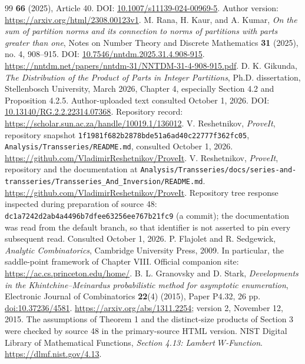 \documentclass[11pt]{article}
\numberwithin{equation}{section}
\theoremstyle{definition}\newtheorem{definition}[theorem]{Definition}
\theoremstyle{remark}\newtheorem{remark}[theorem]{Remark}
\begin{document}
{\begin{thebibliography}{99}
\textbf{66} (2025), Article 40. DOI:
\href{https://doi.org/10.1007/s11139-024-00969-5}{10.1007/s11139-024-00969-5}.
Author version: \url{https://arxiv.org/html/2308.00123v1}.
 M. Rana, H. Kaur, and A. Kumar,
\emph{On the sum of partition norms and its connection to norms of partitions
with parts greater than one}, Notes on Number Theory and Discrete Mathematics
\textbf{31} (2025), no. 4, 908--915. DOI:
\href{https://doi.org/10.7546/nntdm.2025.31.4.908-915}{10.7546/nntdm.2025.31.4.908-915}.
\url{https://nntdm.net/papers/nntdm-31/NNTDM-31-4-908-915.pdf}.
 D. K. Gikunda,
\emph{The Distribution of the Product of Parts in Integer Partitions},
Ph.D. dissertation, Stellenbosch University, March 2026, Chapter 4,
especially Section 4.2 and Proposition 4.2.5. Author-uploaded text consulted
October 1, 2026. DOI:
\href{https://doi.org/10.13140/RG.2.2.22314.07368}{10.13140/RG.2.2.22314.07368}.
Repository record: \url{https://scholar.sun.ac.za/handle/10019.1/136012}.
 V. Reshetnikov,
\emph{ProveIt}, repository snapshot
\texttt{1f1981f682b2878bde51a6ad40c22777f362fc05},
\texttt{Analysis/Transseries/README.md}, consulted October 1, 2026.
\url{https://github.com/VladimirReshetnikov/ProveIt}.
 V. Reshetnikov, \emph{ProveIt}, repository and the
documentation at
\nolinkurl{Analysis/Transseries/docs/series-and-transseries/Transseries_And_Inversion/README.md}.
\url{https://github.com/VladimirReshetnikov/ProveIt}.  Repository tree response
inspected during preparation of source 48:
\texttt{dc1a7242d2ab4a4496b7dfee63256ee767b21fc9} (a commit); the documentation
was read from the default branch, so that identifier is not asserted to pin
every subsequent read.  Consulted October 1, 2026.
 P. Flajolet and R. Sedgewick, \emph{Analytic Combinatorics},
Cambridge University Press, 2009.  In particular, the saddle-point framework
of Chapter VIII.  Official companion site: \url{https://ac.cs.princeton.edu/home/}.
 B. L. Granovsky and D. Stark, \emph{Developments in the
Khintchine--Meinardus probabilistic method for asymptotic enumeration},
Electronic Journal of Combinatorics \textbf{22}(4) (2015), Paper P4.32, 26 pp.
\href{https://doi.org/10.37236/4581}{doi:10.37236/4581}.
\url{https://arxiv.org/abs/1311.2254}; version 2, November 12, 2015.  The
assumptions of Theorem 1 and the distinct-size products of Section 3 were
checked by source 48 in the primary-source HTML version.
 NIST Digital Library of Mathematical Functions,
\emph{Section 4.13: Lambert $W$-Function}. \url{https://dlmf.nist.gov/4.13}.

\end{thebibliography}}
\end{document}
